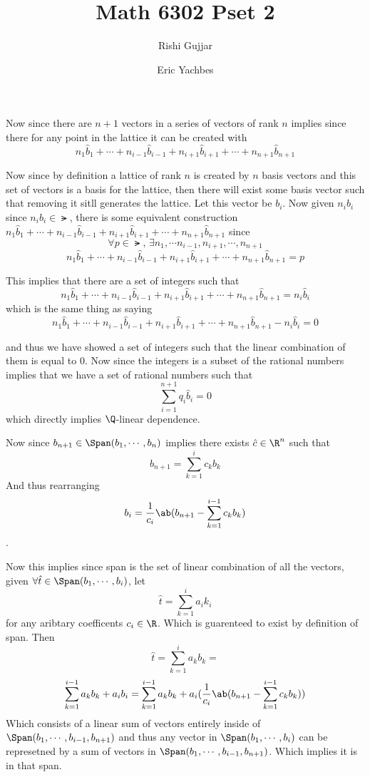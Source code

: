 \documentclass[12pt]{amsart}
\title{Math 6302 Pset 2}
\author{Rishi Gujjar}
\author{Eric Yachbes}
\begin{document}
  \maketitle
  \begin{problem}
    \begin{subproblem}
    Now since there are $n+1$ vectors in a series of vectors of rank $n$ implies since there for any point in the lattice it can be created with 
    \[n_1 \hat b_1+\cdots+n_{i-1}\hat b_{i-1}+n_{i+1}\hat b_{i+1} + \cdots + n_{n+1} \hat b_{n+1} \] 

     Now since by definition a lattice of rank $n$ is created by $n$ basis vectors and this set of vectors is a basis for the lattice, then there will exist some basis vector such that removing it sitll generates the lattice. Let this vector be $b_i$. Now given $n_i b_i$ since $n_i b_i \in \lat$, there is some equivalent construction  
    $n_1 \hat b_1+\cdots+n_{i-1}\hat b_{i-1}+n_{i+1}\hat b_{i+1} + \cdots + n_{n+1} \hat b_{n+1} $ since 
    \[\forall p\in\lat,\,\exists n_1,\cdots n_{i-1},n_{i+1},\cdots,n_{n+1}\]
    \[n_1 \hat b_1+\cdots+n_{i-1}\hat b_{i-1}+n_{i+1}\hat b_{i+1} + \cdots + n_{n+1} \hat b_{n+1} = p\]

    This implies that there are a set of integers such that 
    \[n_1 \hat b_1+\cdots+n_{i-1}\hat b_{i-1}+n_{i+1}\hat b_{i+1} + \cdots + n_{n+1} \hat b_{n+1} = n_i\hat b_i \]
    which is the same thing as saying 
    \[n_1 \hat b_1+\cdots+n_{i-1}\hat b_{i-1}+n_{i+1}\hat b_{i+1} + \cdots + n_{n+1} \hat b_{n+1} - n_i\hat b_i =0 \]

    and thus we have showed a set of integers such that the linear combination of them is equal to 0. Now since the integers is a subset of the rational numbers implies that we have a set of rational numbers such that 
    \[\sum_{i=1}^{n+1}q_i \hat b_i = 0\]
  which directly implies $\Q$-linear dependence. 
    \end{subproblem}
    \begin{subproblem}
      Now since $b_{n+1}\in \Span(b_1,\cdots,b_n)$ implies there exists $\hat c\in \R^n$ such that 
      \[b_{n+1}= \sum_{k=1}^i c_k b_k\]
    And thus rearranging 
    \[b_i = \frac1{c_i} \ab(b_{n+1}- \sum_{k=1}^{i-1} c_k b_k)\].

    Now this implies since span is the set of linear combination of all the vectors, given $\forall \hat t \in\Span(b_1,\cdots,b_i)$, let 
    \[\hat t = \sum_{k=1}^i a_i k_i\]
    for any aribtary coefficents $c_i\in \R$. Which is guarenteed to exist by definition of span. Then 
    \[\hat t = \sum_{k=1}^i a_k b_k = \]
    \[\sum_{k=1}^{i-1}a_k b_k + a_i b_i = \sum_{k=1}^{i-1}a_k b_k + a_i(\frac1{c_i} \ab(b_{n+1}- \sum_{k=1}^{i-1} c_k b_k))\] 
    Which consists of a linear sum of vectors entirely inside of $\Span(b_1,\cdots,b_{i-1},b_{n+1})$ and thus any vector in $\Span(b_1,\cdots,b_i)$ can be represetned by a sum of vectors in $\Span(b_1,\cdots,b_{i-1},b_{n+1})$. Which implies it is in that span.



\end{subproblem}
\end{problem}
\end{document}
